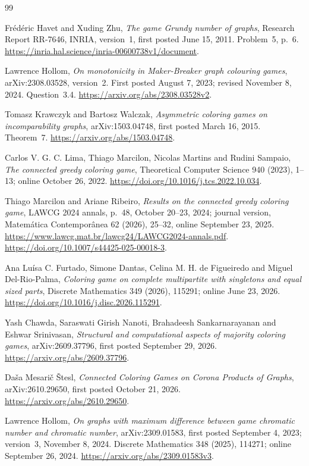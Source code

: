 \documentclass[11pt]{article}
\begin{document}
\begin{thebibliography}{99}

Fr\'ed\'eric Havet and Xuding Zhu,
\emph{The game Grundy number of graphs},
Research Report RR-7646, INRIA, version~1, first posted June 15, 2011.
Problem~5, p.~6.
\url{https://inria.hal.science/inria-00600738v1/document}.

Lawrence Hollom,
\emph{On monotonicity in Maker-Breaker graph colouring games},
arXiv:2308.03528, version~2.
First posted August 7, 2023; revised November 8, 2024.
Question~3.4.
\url{https://arxiv.org/abs/2308.03528v2}.

Tomasz Krawczyk and Bartosz Walczak,
\emph{Asymmetric coloring games on incomparability graphs},
arXiv:1503.04748, first posted March 16, 2015.
Theorem~7.
\url{https://arxiv.org/abs/1503.04748}.


Carlos V. G. C. Lima, Thiago Marcilon, Nicolas Martins and Rudini Sampaio,
\emph{The connected greedy coloring game},
Theoretical Computer Science 940 (2023), 1--13; online October 26, 2022.
\url{https://doi.org/10.1016/j.tcs.2022.10.034}.

Thiago Marcilon and Ariane Ribeiro,
\emph{Results on the connected greedy coloring game},
LAWCG 2024 annals, p.~48, October 20--23, 2024;
journal version, Matem\'atica Contempor\^anea 62 (2026), 25--32,
online September 23, 2025.
\url{https://www.lawcg.mat.br/lawcg24/LAWCG2024-annals.pdf}.
\url{https://doi.org/10.1007/s44425-025-00018-3}.

Ana Lu\'isa C. Furtado, Simone Dantas, Celina M. H. de Figueiredo and
Miguel Del-Rio-Palma,
\emph{Coloring game on complete multipartite with singletons and equal sized parts},
Discrete Mathematics 349 (2026), 115291; online June 23, 2026.
\url{https://doi.org/10.1016/j.disc.2026.115291}.

Yash Chawda, Saraswati Girish Nanoti, Brahadeesh Sankarnarayanan and
Eshwar Srinivasan,
\emph{Structural and computational aspects of majority coloring games},
arXiv:2609.37796, first posted September 29, 2026.
\url{https://arxiv.org/abs/2609.37796}.

Da\v{s}a Mesari\v{c} \v{S}tesl,
\emph{Connected Coloring Games on Corona Products of Graphs},
arXiv:2610.29650, first posted October 21, 2026.
\url{https://arxiv.org/abs/2610.29650}.

Lawrence Hollom,
\emph{On graphs with maximum difference between game chromatic number and chromatic number},
arXiv:2309.01583, first posted September 4, 2023; version~3, November 8, 2024.
Discrete Mathematics 348 (2025), 114271; online September 26, 2024.
\url{https://arxiv.org/abs/2309.01583v3}.


\end{thebibliography}
\end{document}
